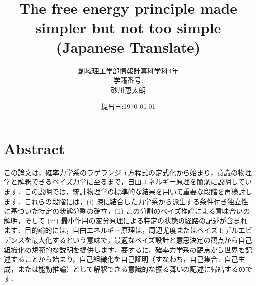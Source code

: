 \documentclass[a4paper, titlepage]{jsarticle}
\title{\Huge The free energy principle made simpler but not too simple (Japanese Translate)}
\author{\Large 創域理工学部\quad 情報計算科学科\quad 4年\\\Large 学籍番号\;:\;6322045\\\Large 砂川恵太朗}
\date{提出日\;:\;\today}
\begin{document}
\maketitle

\section*{Abstract}
この論文は，確率力学系のラゲランジュ方程式の定式化から始まり，意識の物理学と解釈できるベイズ力学に至るまで，自由エネルギー原理を簡潔に説明しています．この説明では，統計物理学の標準的な結果を用いて重要な段階を再検討します．これらの段階には，(i) 疎に結合した力学系から派生する条件付き独立性に基づいた特定の状態分割の確立，(ii) この分割のベイズ推論による意味合いの解明，そして (iii) 最小作用の変分原理による特定の状態の経路の記述が含まれます．目的論的には，自由エネルギー原理は，周辺尤度またはベイズモデルエビデンスを最大化するという意味で，最適なベイズ設計と意思決定の観点から自己組織化の規範的な説明を提供します．要するに，確率力学系の観点から世界を記述することから始まり，自己組織化を自己証明（すなわち，自己集合，自己生成，または能動推論）として解釈できる意識的な振る舞いの記述に帰結するのです．
\end{document}
